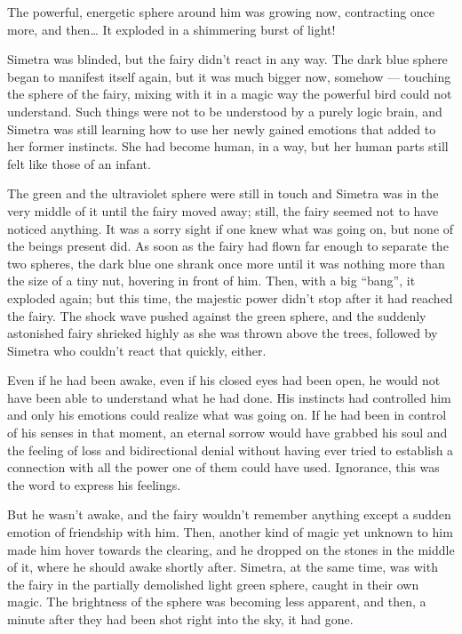 The powerful, energetic sphere around him was growing now, contracting once more, and then\dots{}
It exploded in a shimmering burst of light!

Simetra was blinded, but the fairy didn't react in any way. The dark blue sphere began to manifest itself again, but it was much bigger now, somehow --- touching the sphere of the fairy, mixing with it in a magic way the powerful bird could not understand. Such things were not to be understood by a purely logic brain, and Simetra was still learning how to use her newly gained emotions that added to her former instincts. She had become human, in a way, but her human parts still felt like those of an infant.

The green and the ultraviolet sphere were still in touch and Simetra was in the very middle of it until the fairy moved away; still, the fairy seemed not to have noticed anything. It was a sorry sight if one knew what was going on, but none of the beings present did. 
As soon as the fairy had flown far enough to separate the two spheres, the dark blue one shrank once more until it was nothing more than the size of a tiny nut, hovering in front of him. 
Then, with a big \enquote{bang}, it exploded again; but this time, the majestic power didn't stop after it had reached the fairy. The shock wave pushed against the green sphere, and the suddenly astonished fairy shrieked highly as she was thrown above the trees, followed by Simetra who couldn't react that quickly, either.

Even if he had been awake, even if his closed eyes had been open, he would not have been able to understand what he had done. His instincts had controlled him and only his emotions could realize what was going on. If he had been in control of his senses in that moment, an eternal sorrow would have grabbed his soul and the feeling of loss and bidirectional denial without having ever tried to establish a connection with all the power one of them could have used. Ignorance, this was the word to express his feelings.

But he wasn't awake, and the fairy wouldn't remember anything except a sudden emotion of friendship with him. 
Then, another kind of magic yet unknown to him made him hover towards the clearing, and he dropped on the stones in the middle of it, where he should awake shortly after. 
Simetra, at the same time, was with the fairy in the partially demolished light green sphere, caught in their own magic. The brightness of the sphere was becoming less apparent, and then, a minute after they had been shot right into the sky, it had gone.

